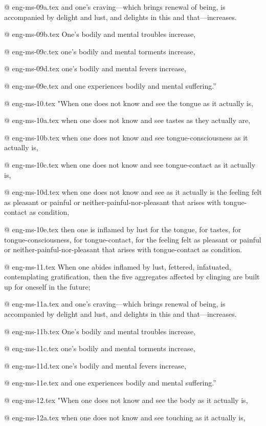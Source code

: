 @ eng-ms-09a.tex
and one’s craving—which brings renewal of being, is accompanied by delight and lust, and delights in this and that—increases.

@ eng-ms-09b.tex
One’s bodily and mental troubles increase,

@ eng-ms-09c.tex
one’s bodily and mental torments increase,

@ eng-ms-09d.tex
one’s bodily and mental fevers increase,

@ eng-ms-09e.tex
and one experiences bodily and mental suffering.”

@ eng-ms-10.tex
"When one does not know and see the tongue as it actually is,

@ eng-ms-10a.tex
when one does not know and see tastes as they actually are,

@ eng-ms-10b.tex
when one does not know and see tongue-consciousness as it actually is,

@ eng-ms-10c.tex
when one does not know and see tongue-contact as it actually is,

@ eng-ms-10d.tex
when one does not know and see as it actually is the feeling felt as pleasant or painful or neither-painful-nor-pleasant that arises with tongue-contact as condition,

@ eng-ms-10e.tex
then one is inflamed by lust for the tongue, for tastes, for tongue-consciousness, for tongue-contact, for the feeling felt as pleasant or painful or neither-painful-nor-pleasant that arises with tongue-contact as condition.

@ eng-ms-11.tex
When one abides inflamed by lust, fettered, infatuated, contemplating gratification, then the five aggregates affected by clinging are built up for oneself in the future;

@ eng-ms-11a.tex
and one’s craving—which brings renewal of being, is accompanied by delight and lust, and delights in this and that—increases.

@ eng-ms-11b.tex
One’s bodily and mental troubles increase,

@ eng-ms-11c.tex
one’s bodily and mental torments increase,

@ eng-ms-11d.tex
one’s bodily and mental fevers increase,

@ eng-ms-11e.tex
and one experiences bodily and mental suffering.”


@ eng-ms-12.tex
"When one does not know and see the body as it actually is,

@ eng-ms-12a.tex
when one does not know and see touching as it actually is,

